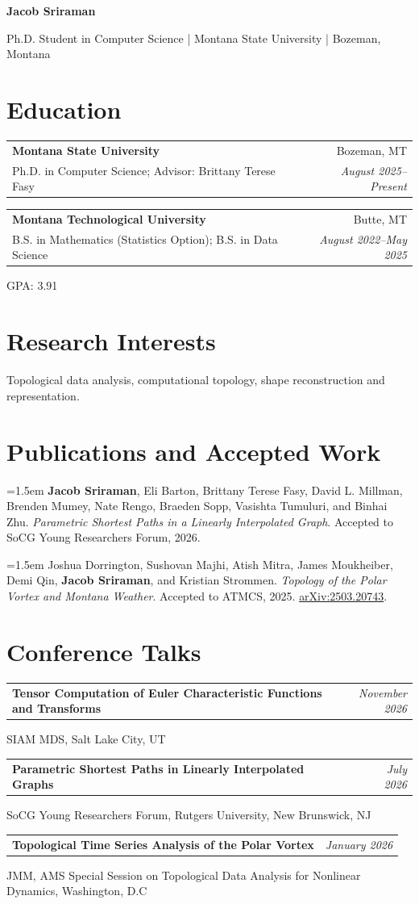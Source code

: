 \documentclass[10pt,letterpaper]{article}
\makeatletter
\newcommand{\cventry}[4]{%
  \begin{tabularx}{\textwidth}{@{}X r@{}}
    \textbf{#1} & #2 \\
    #3 & \textit{#4}
  \end{tabularx}\par\vspace{5pt}%
}
\newcommand{\presentation}[3]{%
  \begin{tabularx}{\textwidth}{@{}X r@{}}
    \textbf{#1} & \textit{#2}
  \end{tabularx}\par
  #3\par\vspace{7pt}%
}
\newcommand{\publication}[1]{%
  \par\begingroup\hangindent=1.5em\hangafter=1
  #1\par\endgroup\vspace{7pt}%
}
\makeatother
\begin{document}
\begin{centering}
{\LARGE\bfseries Jacob Sriraman}\par\vspace{4pt}
Ph.D. Student in Computer Science \quad | \quad Montana State University
\quad | \quad Bozeman, Montana\par\vspace{4pt}
\end{centering}

\section*{Education}
\cventry{Montana State University}{Bozeman, MT}
  {Ph.D. in Computer Science; Advisor: Brittany Terese Fasy}
  {August 2025--Present}
\cventry{Montana Technological University}{Butte, MT}
  {B.S. in Mathematics (Statistics Option); B.S. in Data Science}
  {August 2022--May 2025}
 GPA: 3.91

\section*{Research Interests}
Topological data analysis, computational topology, shape reconstruction and representation.

\section*{Publications and Accepted Work}
\publication{\textbf{Jacob Sriraman}, Eli Barton, Brittany Terese Fasy, David L. Millman,
Brenden Mumey, Nate Rengo, Braeden Sopp, Vasishta Tumuluri, and Binhai Zhu.
\emph{Parametric Shortest Paths in a Linearly Interpolated Graph}.
Accepted to SoCG Young Researchers Forum, 2026.}

\publication{Joshua Dorrington, Sushovan Majhi, Atish Mitra,
James Moukheiber, Demi Qin, \textbf{Jacob Sriraman}, and Kristian Strommen.
\emph{Topology of the Polar Vortex and Montana Weather}.
Accepted to ATMCS, 2025. \href{https://arxiv.org/abs/2503.20743}{arXiv:2503.20743}.}

\section*{Conference Talks}
\presentation{Tensor Computation of Euler Characteristic Functions and
Transforms}{November 2026}{SIAM MDS, Salt Lake City, UT}
\presentation{Parametric Shortest Paths in Linearly Interpolated Graphs}
  {July 2026}
  {SoCG Young Researchers Forum, Rutgers University, New Brunswick, NJ}
\presentation{Topological Time Series Analysis of the Polar Vortex}
  {January 2026}
  {JMM, AMS Special Session on Topological Data
  Analysis for Nonlinear Dynamics, Washington, D.C}
\end{document}
